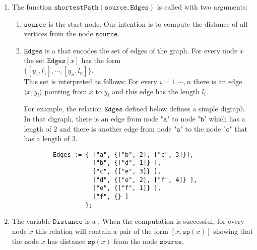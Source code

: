 \noindent
\begin{enumerate}
\item The function $\texttt{shortestPath}(\texttt{source}, \texttt{Edges})$ is called with two arguments:
      \begin{enumerate}
      \item $\texttt{source}$ is the start node.  Our intention is to compute the distance of all
            vertices from the node $\texttt{source}$.
      \item $\texttt{Edges}$ is a  that encodes the set of edges of the graph.  For
            every node $x$ the set $\texttt{Edges}[x]$ has the form
            \\[0.2cm]
            \hspace*{1.3cm}
            $\bigl\{ [y_1, l_1], \cdots, [y_n, l_n] \bigr\}$.
            \\[0.2cm]
            This set is interpreted as follows: For every $i = 1,\cdots,n$ there is an edge
            $\langle x, y_i \rangle$ pointing from $x$ to $y_i$ and this edge has the length $l_i$.

            For example, the relation $\texttt{Edges}$ defined below defines a simple digraph.
            In that digraph, there is an edge from node $\texttt{"a"}$ to node $\texttt{"b"}$ which has a
            length of $2$ and there is another edge from node $\texttt{"a"}$ to the node $\texttt{"c"}$ that has a length of $3$.
            \begin{verbatim}
        Edges := { ["a", {["b", 2], ["c", 3]}], 
                   ["b", {["d", 1]} ],
                   ["c", {["e", 3]} ],  
                   ["d", {["e", 2], ["f", 4]} ],  
                   ["e", {["f", 1]} ],
                   ["f", {} ]
                 };
           \end{verbatim}
      \end{enumerate}
\item The variable $\texttt{Distance}$ is a .  When the computation is
      successful, for every node $x$ this relation will contain a pair of the form
      $[x, \texttt{sp}(x)]$ showing that the node $x$ has distance $\texttt{sp}(x)$ from the node $\texttt{source}$.


\end{enumerate}
